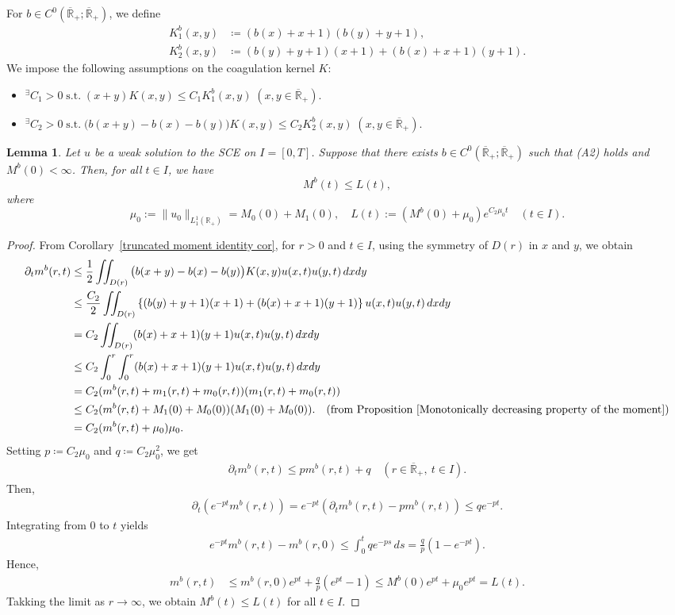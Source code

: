 \documentclass[a4paper,11pt]{article}
\newtheorem{lem}[thm]{Lemma}
\def\Rp{{\mathbb R}_+}
\def\Rb{\overline{{\mathbb R}}_+}
\begin{document}
For $b\in C^0(\Rb;\Rb)$, we define
\begin{align*}
  K_1^b(x,y) &\coloneqq(b(x)+x+1)(b(y)+y+1), \\
  K_2^b(x,y) &\coloneqq(b(y)+y+1)(x+1)+(b(x)+x+1)(y+1).
\end{align*}
We impose the following assumptions on the coagulation kernel $K$:
\begin{itemize} 
\item[(A1)] 
${}^\exists C_1 >0 \; \mathrm{s.t.}\; (x+y)K(x,y)\leq C_1 K_1^b(x,y)\;(x,y\in\Rb)$.
\item[(A2)]
${}^\exists C_2 >0 \; \mathrm{s.t.}\; \big(b(x+y)-b(x)-b(y)\big)K(x,y)\leq C_2 K_2^b(x,y)\;(x,y\in\Rb)$.
\end{itemize}
\begin{lem} \label{Sahidul-Kimura-Lem1}
Let $u$ be a weak solution to the SCE on $I=[0,T]$. 
Suppose that there exists $b\in C^0(\Rb;\Rb)$ such that (A2) holds and $M^b(0)<\infty$.
Then, for all $t\in I$, we have 
\[
M^b(t)\le L(t),
\]
where
\[
\mu_0:=\|u_0\|_{L^1_1(\Rp)}=M_0(0)+M_1(0),\quad L(t):=(M^b(0)+\mu_0)
e^{C_2\mu_0t}\quad (t\in I).
\]
\end{lem}
\begin{proof}
From Corollary~\ref{truncated moment identity cor}, for $r>0$ and $t\in I$, using the symmetry of $D(r)$ in $x$ and $y$, we obtain
\begin{align*}
\partial_t m^b (r,t) 
&\le
\frac{1}{2}\iint_{D(r)} \big(b(x+y)-b(x)-b(y)\big)K(x,y)u(x,t)u(y,t)\,dxdy \\
&\le
\frac{C_2}{2}\iint_{D(r)}\left\{(b(y)+y+1)(x+1)+(b(x)+x+1)(y+1)\right\}u(x,t)u(y,t)\,dxdy \\
&= C_2\iint_{D(r)}(b(x)+x+1)(y+1)u(x,t)u(y,t)\,dxdy \\
&\le 
C_2\int^r_0\int^r_0(b(x)+x+1)(y+1)u(x,t)u(y,t)\,dxdy \\
&= C_2(m^b (r,t) +m_1 (r,t) +m_0 (r,t))(m_1(r,t)+m_0(r,t)) \\
&\leq C_2(m^b(r,t) +M_1(0)+M_0(0))(M_1(0)+M_0(0)).
\quad\text{(from Proposition~\ref{Monotonically decreasing property of the moment})}\\
&= C_2(m^b(r,t) +\mu_0)\mu_0.
\end{align*}
Setting $p \coloneqq C_2 \mu_0$ and $q\coloneqq C_2\mu_0^2$, we get 
\begin{align*}
\partial_t m^b (r,t) \leq p m^b(r,t) + q
\quad (r\in\Rb,~t\in I).
\end{align*}
Then,
\begin{align*}
\partial_t (e^{-pt}m^b(r,t)) = e^{-pt}(\partial_t m^b(r,t) - pm^b(r,t))\leq qe^{-pt}.
\end{align*}
Integrating from $0$ to $t$ yields
\begin{align*}
e^{-pt}m^b(r,t)-m^b(r,0) \leq \int^t_0 qe^{-ps}\,ds = \frac{q}{p}(1-e^{-pt}).
\end{align*}
Hence,
\begin{align*}
m^b(r,t)&\leq m^b(r,0)e^{pt} + \frac{q}{p}(e^{pt}-1) 
\leq M^b(0)e^{pt} + \mu_0e^{pt}=L(t).
\end{align*}
Takking the limit as $r\to \infty$, 
we obtain $M^b(t)\leq L(t)$ for all $t\in I$.
\end{proof}
\end{document}
